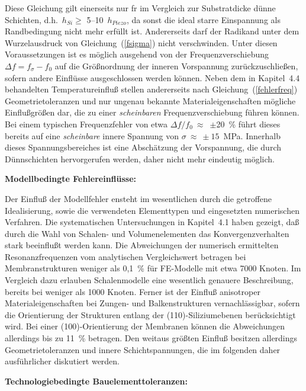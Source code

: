 Diese Gleichung gilt einerseits nur fr im Vergleich zur Substratdicke dünne
Schichten, d.h.\ $h_{Si}\geq$ 5--10~$h_{Piezo}$, da sonst die ideal starre
Einspannung als Randbedingung nicht mehr erfüllt ist. Andererseits darf der
Radikand unter dem Wurzelausdruck von Gleichung~(\ref{fsigma}) nicht
verschwinden. Unter diesen Voraussetzungen ist es möglich ausgehend von der
Frequenzverschiebung $\Delta f = f_{\sigma} - f_{0}$ auf die Größnordnung
der inneren Vorspannung zurückzuschließen, sofern andere Einflüsse
ausgeschlossen werden
können. Neben dem in Kapitel~4.4 behandelten Temperatureinfluß stellen
andererseits nach Gleichung~(\ref{fehlerfreq}) Geometrietoleranzen und nur
ungenau bekannte Materialeigenschaften mögliche Einflußgrößen dar, die zu
einer {\em scheinbaren} Frequenzverschiebung führen können. Bei einem
typischen Frequenzfehler von etwa $\Delta f/f_{0}~\approx$~$\pm$20~\% führt
dieses bereits auf eine {\em scheinbare} innere Spannung von
$\sigma~\approx~\pm15$~MPa. Innerhalb dieses Spannungsbereiches ist eine
Abschätzung der Vorspannung, die durch Dünnschichten hervorgerufen werden,
daher nicht mehr eindeutig möglich.


\newpage
{\bf Modellbedingte Fehlereinflüsse:}

Der Einfluß der Modellfehler ensteht im wesentlichen durch die getroffene
Idealisierung, sowie die verwendeten Elementtypen und eingesetzten
numerischen Verfahren. Die systematischen Untersuchungen in Kapitel~4.1
haben gezeigt, daß durch die Wahl von Schalen- und Volumenelementen das
Konvergenzverhalten stark beeinflußt werden kann. Die Abweichungen der
numerisch ermittelten Resonanzfrequenzen vom analytischen Vergleichswert
betragen bei Membranstrukturen weniger als 0,1~\% für FE-Modelle mit etwa
7000 Knoten. Im Vergleich dazu erlauben Schalenmodelle eine wesentlich
genauere Beschreibung, bereits bei weniger als 1000 Knoten.
Ferner ist der Einfluß anisotroper
Materialeigenschaften bei Zungen- und Balkenstrukturen vernachlässigbar,
sofern die Orientierung der Strukturen entlang der (110)-Siliziumebenen
berücksichtigt wird. Bei einer (100)-Orientierung der Membranen können
die Abweichungen allerdings bis zu 11~\% betragen. Den weitaus größten
Einfluß besitzen allerdings Geometrietoleranzen und innere
Schichtspannungen, die im folgenden daher ausführlicher diskutiert werden.


{\bf Technologiebedingte Bauelementtoleranzen:}

